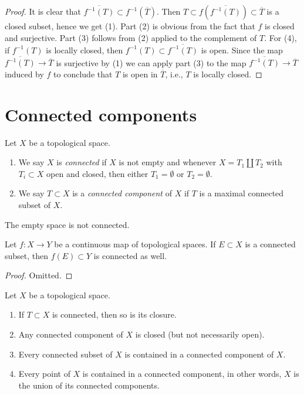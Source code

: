 \begin{proof}
It is clear that $\overline{f^{-1}(T)} \subset f^{-1}(\overline{T})$.
Then $T \subset f(\overline{f^{-1}(T)}) \subset \overline{T}$
is a closed subset, hence we get (1). Part (2) is obvious from
the fact that $f$ is closed and surjective.
Part (3) follows from (2) applied to the complement of $T$.
For (4), if $f^{-1}(T)$ is locally closed, then
$f^{-1}(T) \subset \overline{f^{-1}(T)}$ is open.
Since the map $\overline{f^{-1}(T)} \to \overline{T}$ is surjective
by (1) we can apply part (3) to the map $\overline{f^{-1}(T)} \to \overline{T}$
induced by $f$ to conclude that $T$ is open in
$\overline{T}$, i.e., $T$ is locally closed.
\end{proof}










\section{Connected components}
\label{section-connected-components}

\begin{definition}
\label{definition-connected-components}
Let $X$ be a topological space.
\begin{enumerate}
\item We say $X$ is {\it connected} if $X$ is not empty and whenever
$X = T_1 \amalg T_2$ with $T_i \subset X$ open and closed, then either
$T_1 = \emptyset$ or $T_2 = \emptyset$.
\item We say $T \subset X$ is a {\it connected component} of $X$ if
$T$ is a maximal connected subset of $X$.
\end{enumerate}
\end{definition}

\noindent
The empty space is not connected.

\begin{lemma}
\label{lemma-image-connected-space}
Let $f : X \to Y$ be a continuous map of topological spaces.
If $E \subset X$ is a connected subset, then $f(E) \subset Y$
is connected as well.
\end{lemma}

\begin{proof}
Omitted.
\end{proof}

\begin{lemma}
\label{lemma-connected-components}
Let $X$ be a topological space.
\begin{enumerate}
\item If $T \subset X$ is connected, then so is its closure.
\item Any connected component of $X$ is closed (but not necessarily open).
\item Every connected subset of $X$ is contained in a connected
component of $X$.
\item Every point of $X$ is contained in a connected component, in other
words, $X$ is the union of its connected components.
\end{enumerate}
\end{lemma}

